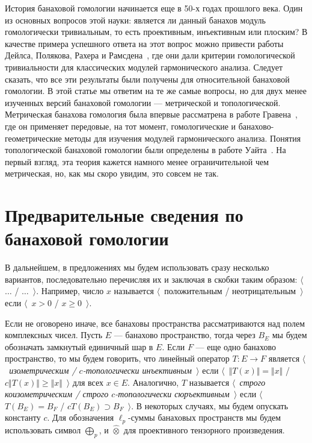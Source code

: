 \documentclass{article}
\numberwithin{equation}{section}
\theoremstyle{plain}
\theoremstyle{definition}
\newcommand{\projtens}{\mathbin{\widehat{\otimes}}}
\begin{document}
\begin{fulltext}
История банаховой гомологии начинается еще в 50-х годах прошлого века. Один из
основных вопросов этой науки: является ли данный банахов модуль гомологически
тривиальным, то есть проективным, инъективным или плоским? В качестве примера
успешного ответа на этот вопрос можно привести работы Дейлса, Полякова, Рахера и
Рамсдена~\cite{DalPolHomolPropGrAlg, RamsHomPropSemgroupAlg,
RachInjModAndAmenGr}, где они дали критерии гомологической тривиальности для
классических модулей гармонического анализа. Следует сказать, что все эти
результаты были получены для относительной банаховой гомологии. В этой статье мы
ответим на те же самые вопросы, но для двух менее изученных версий банаховой
гомологии --- метрической и топологической. Метрическая банахова гомология была
впервые рассматрена в работе Гравена~\cite{GravInjProjBanMod}, где он применяет
передовые, на тот момент, гомологические и банахово-геометрические методы для
изучения модулей гармонического анализа. Понятия топологической банаховой
гомологии были определены в работе Уайта~\cite{WhiteInjmoduAlg}. На первый
взгляд, эта теория кажется намного менее ограничительной чем метрическая, но,
как мы скоро увидим, это совсем не так.



\section{Предварительные сведения по банаховой
    гомологии}\label{SectionPreliminariesOnBanachHomology}

В дальнейшем, в предложениях мы будем использовать сразу несколько вариантов,
последовательно перечисляя их и заключая в скобки таким образом:
$\langle$~$\ldots$ / $\ldots$~$\rangle$. Например, число $x$ называется
$\langle$~положительным / неотрицательным~$\rangle$ если $\langle$~$x>0$ /
$x\geq 0$~$\rangle$.

Если не оговорено иначе, все банаховы пространства рассматриваются над полем
комплексных чисел. Пусть $E$ --- банахово пространство, тогда через $B_E$ мы
будем обозначать замкнутый единичный шар в $E$. Если $F$ --- еще одно банахово
пространство, то мы будем говорить, что линейный оператор $T:E\to F$ является
\emph{$\langle$~изометрическим / $c$-топологически инъективным~$\rangle$} если
$\langle$~$\Vert T(x)\Vert=\Vert x\Vert$ / $c\Vert T(x)\Vert\geq\Vert
x\Vert$~$\rangle$ для всех $x\in E$. Аналогично, $T$ называется
\emph{$\langle$~строго коизометрическим / строго $c$-топологически
сюръективным~$\rangle$} если $\langle$~$T(B_E)=B_F$ / $c T(B_E)\supset
B_F$~$\rangle$. В некоторых случаях, мы будем опускать константу $c$. Для
обозначения $\ell_p$-суммы банаховых пространств мы будем использовать символ
$\bigoplus_p$, и $\projtens$ для проективного тензорного произведения. 


\end{fulltext}
\end{document}
